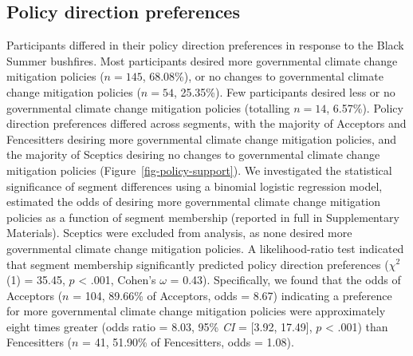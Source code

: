 \documentclass[
  letterpaper,
  DIV=11,
  numbers=noendperiod]{scrartcl}
\newcounter{none} %
\begin{document}
\subsection{Policy direction
preferences}\label{policy-direction-preferences-1}

Participants differed in their policy direction preferences in response
to the Black Summer bushfires. Most participants desired more
governmental climate change mitigation policies (\(n = 145\), 68.08\%),
or no changes to governmental climate change mitigation policies
(\(n = 54\), 25.35\%). Few participants desired less or no governmental
climate change mitigation policies (totalling \(n = 14\), 6.57\%).
Policy direction preferences differed across segments, with the majority
of Acceptors and Fencesitters desiring more governmental climate change
mitigation policies, and the majority of Sceptics desiring no changes to
governmental climate change mitigation policies
(Figure~\ref{fig-policy-support}). We investigated the statistical
significance of segment differences using a binomial logistic regression
model, estimated the odds of desiring more governmental climate change
mitigation policies as a function of segment membership (reported in
full in Supplementary Materials). Sceptics were excluded from analysis,
as none desired more governmental climate change mitigation policies. A
likelihood-ratio test indicated that segment membership significantly
predicted policy direction preferences (\(\chi^{2}\) (1) = 35.45, \(p\)
\textless{} .001, Cohen's \(\omega\) = 0.43). Specifically, we found
that the odds of Acceptors (\(n\) = 104, 89.66\% of Acceptors, odds =
8.67) indicating a preference for more governmental climate change
mitigation policies were approximately eight times greater (odds ratio =
8.03, 95\% \emph{CI} = {[}3.92, 17.49{]}, \(p\) \textless{} .001) than
Fencesitters (\(n\) = 41, 51.90\% of Fencesitters, odds = 1.08).
\end{document}
